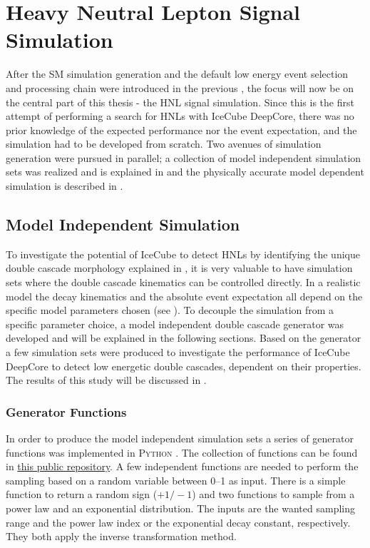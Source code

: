 \setchapterpreamble[u]{\margintoc}

\chapter{Heavy Neutral Lepton Signal Simulation}

After the SM simulation generation and the default low energy event selection and processing chain were introduced in the previous , the focus will now be on the central part of this thesis - the HNL signal simulation. Since this is the first attempt of performing a search for HNLs with IceCube DeepCore, there was no prior knowledge of the expected performance nor the event expectation, and the simulation had to be developed from scratch. Two avenues of simulation generation were pursued in parallel; a collection of model independent simulation sets was realized and is explained in  and the physically accurate model dependent simulation is described in .


\section{Model Independent Simulation} 

To investigate the potential of IceCube to detect HNLs by identifying the unique double cascade morphology explained in , it is very valuable to have simulation sets where the double cascade kinematics can be controlled directly. In a realistic model the decay kinematics and the absolute event expectation all depend on the specific model parameters chosen (see ). To decouple the simulation from a specific parameter choice, a model independent double cascade generator was developed and will be explained in the following sections. Based on the generator a few simulation sets were produced to investigate the performance of IceCube DeepCore to detect low energetic double cascades, dependent on their properties. The results of this study will be discussed in .


\subsection{Generator Functions}

In order to produce the model independent simulation sets a series of generator functions was implemented in \textsc{Python} . The collection of functions can be found in \href{https://github.com/LeanderFischer/icetray_double_cascade_generator_functions}{this public repository}. A few independent functions are needed to perform the sampling based on a random variable between \SIrange[range-phrase={~and~}]{0}{1}{} as input. There is a simple function to return a random sign ($+1/-1$) and two functions to sample from a power law and an exponential distribution. The inputs are the wanted sampling range and the power law index or the exponential decay constant, respectively. They both apply the inverse transformation method.

